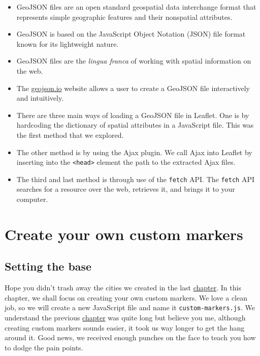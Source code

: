 \documentclass[
]{book}
\begin{document}
\begin{itemize}
\item
  GeoJSON files are an open standard geospatial data interchange format that represents simple geographic features and their nonspatial attributes.
\item
  GeoJSON is based on the JavaScript Object Notation (JSON) file format known for its lightweight nature.
\item
  GeoJSON files are the \emph{lingua franca} of working with spatial information on the web.
\item
  The \href{https://geojson.io/\#map=2/0/20}{geojson.io} website allows a user to create a GeoJSON file interactively and intuitively.
\item
  There are three main ways of loading a GeoJSON file in Leaflet. One is by hardcoding the dictionary of spatial attributes in a JavaScript file. This was the first method that we explored.
\item
  The other method is by using the Ajax plugin. We call Ajax into Leaflet by inserting into the \texttt{\textless{}head\textgreater{}} element the path to the extracted Ajax files.
\item
  The third and last method is through use of the \texttt{fetch} API. The \texttt{fetch} API searches for a resource over the web, retrieves it, and brings it to your computer.
\end{itemize}

\hypertarget{create-your-own-custom-markers}{%
\chapter{Create your own custom markers}\label{create-your-own-custom-markers}}

\hypertarget{setting-the-base}{%
\section{Setting the base}\label{setting-the-base}}

Hope you didn't trash away the cities we created in the last \protect\hyperlink{using-geojson-in-leaflet}{chapter}. In this chapter, we shall focus on creating your own custom markers. We love a clean job, so we will create a new JavaScript file and name it \texttt{custom-markers.js}. We understand the previous \protect\hyperlink{using-geojson-in-leaflet}{chapter} was quite long but believe you me, although creating custom markers sounds easier, it took us way longer to get the hang around it. Good news, we received enough punches on the face to teach you how to dodge the pain points.
\end{document}
